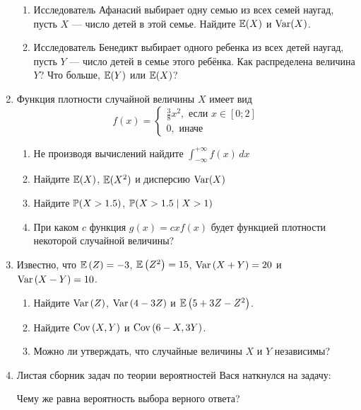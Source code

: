 \begin{enumerate}
\begin{enumerate}
\item Исследователь Афанасий выбирает одну семью из всех семей наугад, пусть $X$ —
число детей в этой семье. Найдите $\E(X)$ и $\Var(X)$.
\item Исследователь Бенедикт выбирает одного ребенка из всех детей наугад, пусть $Y$ —
число детей в семье этого ребёнка. Как распределена величина $Y$? Что больше,
$\E(Y)$ или $\E(X)$?
\end{enumerate}

\item Функция плотности случайной величины $X$ имеет вид
\[
f(x)=
\begin{cases}
\frac{3}{8} x^2, \text{ если } x\in [0;2] \\
0, \text{ иначе }
\end{cases}
\]
\begin{enumerate}
\item Не производя вычислений найдите $\int_{-\infty}^{+\infty}f(x)\,dx$
\item Найдите $\E(X)$, $\E(X^2)$ и дисперсию $\Var(X)$
\item Найдите $\P(X>1.5)$, $\P(X>1.5 \mid X>1)$
\item При каком $c$ функция $g(x)=c x f(x)$ будет функцией плотности некоторой
случайной величины?
\end{enumerate}

\item Известно, что  $\E\left(Z\right)=-3$, $\E\left(Z^{2} \right)=15$,
$\Var\left(X+Y\right)=20$  и  $\Var\left(X-Y\right)=10$.
\begin{enumerate}
\item Найдите $\Var\left(Z\right)$, $\Var\left(4-3Z\right)$ и
$\E\left(5+3Z-Z^{2} \right)$.
\item Найдите $\Cov\left(X,Y\right)$ и $\Cov\left(6-X,3Y\right)$.
\item Можно ли утверждать, что случайные величины $X$ и $Y$ независимы?
\end{enumerate}

\item Листая сборник задач по теории вероятностей Вася наткнулся на задачу:


Чему же равна вероятность выбора верного ответа?


\end{enumerate}
